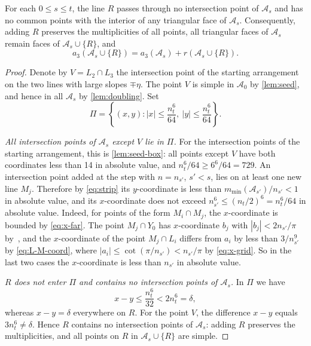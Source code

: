 \begin{lemma}\label{lem:r-avoids}
For each $0\le s\le t$, the line $R$ passes through no intersection point of $\mathcal A_s$ and has no common points with the interior of any triangular face of $\mathcal A_s$.
Consequently, adding $R$ preserves the multiplicities of all points, all triangular faces of $\mathcal A_s$ remain faces of $\mathcal A_s\cup\{R\}$, and
\begin{equation}\label{eq:a3-with-R}
a_3(\mathcal A_s\cup\{R\})
=a_3(\mathcal A_s)+r(\mathcal A_s\cup\{R\}).
\end{equation}
\end{lemma}

\begin{proof}
Denote by $V=L_2\cap L_3$ the intersection point of the starting arrangement on the two lines with large slopes $\mp\eta$. The point $V$ is simple in $\mathcal A_0$ by \cref{lem:seed}, and hence in all $\mathcal A_s$ by \cref{lem:doubling}. Set
\[
\Pi=\left\{(x,y):|x|\le\frac{n_t^6}{64},\ |y|\le\frac{n_t^6}{64}\right\}.
\]

\emph{All intersection points of $\mathcal A_s$ except $V$ lie in $\Pi$.}
For the intersection points of the starting arrangement, this is \cref{lem:seed-box}: all points except $V$ have both coordinates less than 14 in absolute value, and $n_t^6/64\ge6^6/64=729$.
An intersection point added at the step with $n=n_{s'}$, $s'<s$, lies on at least one new line $M_j$. Therefore by \eqref{eq:strip} its $y$-coordinate is less than $m_{\min}(\mathcal A_{s'})/n_{s'}<1$ in absolute value, and its $x$-coordinate does not exceed $n_{s'}^6\le(n_t/2)^6=n_t^6/64$ in absolute value.
Indeed, for points of the form $M_i\cap M_j$, the $x$-coordinate is bounded by \eqref{eq:x-far}. The point $M_j\cap Y_0$ has $x$-coordinate $b_j$ with $|b_j|<2n_{s'}/\pi$ by~\cite[(3)]{bbl}, and the $x$-coordinate of the point $M_j\cap L_i$ differs from $a_i$ by less than $3/n_{s'}^9$ by \eqref{eq:L-M-coord}, where $|a_i|\le\cot(\pi/n_{s'})<n_{s'}/\pi$ by \eqref{eq:x-grid}. So in the last two cases the $x$-coordinate is less than $n_{s'}$ in absolute value.

\emph{$R$ does not enter $\Pi$ and contains no intersection points of $\mathcal A_s$.}
In $\Pi$ we have
\[
x-y\le \frac{n_t^6}{32}<2n_t^6=\delta,
\]
whereas $x-y=\delta$ everywhere on $R$. For the point $V$, the difference $x-y$ equals $3n_t^6\neq\delta$. Hence $R$ contains no intersection points of $\mathcal A_s$: adding $R$ preserves the multiplicities, and all points on $R$ in $\mathcal A_s\cup\{R\}$ are simple.


\end{proof}
